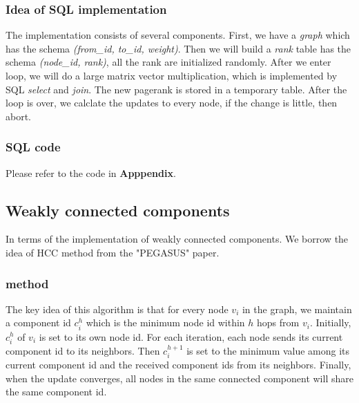 \subsubsection{Idea of SQL implementation}
The implementation consists of several components.
First, we have a \emph{graph} which has the schema \emph{(from\_id, to\_id, weight)}. Then we will build a \emph{rank} table has the schema \emph{(node\_id, rank)}, all the rank are initialized randomly. After we enter loop, we will do a large matrix vector multiplication, which is implemented by SQL \emph{select} and \emph{join}. The new pagerank is stored in a temporary table. After the loop is over, we calclate the updates to every node, if the change is little, then abort.

\subsubsection{SQL code}
Please refer to the code in {\bf Apppendix}.

\subsection{Weakly connected components}
In terms of the implementation of weakly connected components. We borrow the idea of HCC method from the "PEGASUS" paper.\cite{Kang09}

\subsubsection{method}
The key idea of this algorithm is that for every node $v_i$ in the graph, we maintain a component id $c_i^h$ which is the minimum node id within $h$ hops from $v_i$. Initially, $c_i^h$
of $v_i$ is set to its own node id. For each iteration, each node sends its current component id to its neighbors. Then $c_i^{h+1}$ is set to the minimum value among its current component id and the received component ids from its neighbors. Finally, when the update converges, all nodes in the same connected component will share the same component id. 

